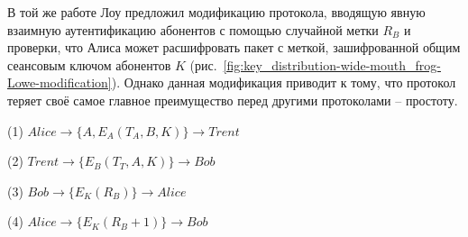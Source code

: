 В той же работе Лоу предложил модификацию протокола, вводящую явную взаимную аутентификацию абонентов с помощью случайной метки $R_B$ и проверки, что Алиса может расшифровать пакет с меткой, зашифрованной общим сеансовым ключом абонентов $K$ (рис.~\ref{fig:key_distribution-wide-mouth_frog-Lowe-modification}). Однако данная модификация приводит к тому, что протокол теряет своё самое главное преимущество перед другими протоколами -- простоту.

\begin{protocol}
	\item[(1)] $Alice \to \{ A, E_A \left( T_A, B, K \right) \} \to Trent$
	\item[(2)] $Trent \to \{ E_B \left( T_T, A, K \right) \} \to Bob$
	\item[(3)] $Bob \to \{ E_K \left( R_B \right) \} \to Alice$
	\item[(4)] $Alice \to \{ E_K \left( R_B + 1 \right) \} \to Bob$
\end{protocol}

